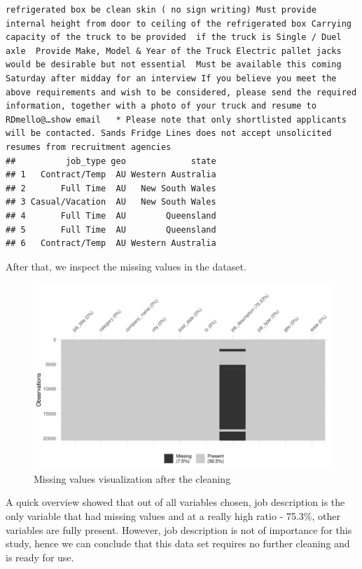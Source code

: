 \documentclass[11pt,a4paper,]{article}
\begin{document}
\begin{verbatim}
refrigerated box be clean skin ( no sign writing) Must provide internal height from door to ceiling of the refrigerated box Carrying capacity of the truck to be provided  if the truck is Single / Duel axle  Provide Make, Model & Year of the Truck Electric pallet jacks would be desirable but not essential  Must be available this coming Saturday after midday for an interview If you believe you meet the above requirements and wish to be considered, please send the required information, together with a photo of your truck and resume to RDmello@…show email   * Please note that only shortlisted applicants will be contacted. Sands Fridge Lines does not accept unsolicited resumes from recruitment agencies 
##          job_type geo             state
## 1   Contract/Temp  AU Western Australia
## 2       Full Time  AU   New South Wales
## 3 Casual/Vacation  AU   New South Wales
## 4       Full Time  AU        Queensland
## 5       Full Time  AU        Queensland
## 6   Contract/Temp  AU Western Australia
\end{verbatim}

After that, we inspect the missing values in the dataset.

\begin{figure}
\centering
\includegraphics{Team_JHDP_Assignment4_files/figure-latex/missing-1.pdf}
\caption{\label{fig:missing}Missing values visualization after the cleaning}
\end{figure}

A quick overview showed that out of all variables chosen, job description is the only variable that had missing values and at a really high ratio - 75.3\%, other variables are fully present. However, job description is not of importance for this study, hence we can conclude that this data set requires no further cleaning and is ready for use.
\end{document}
